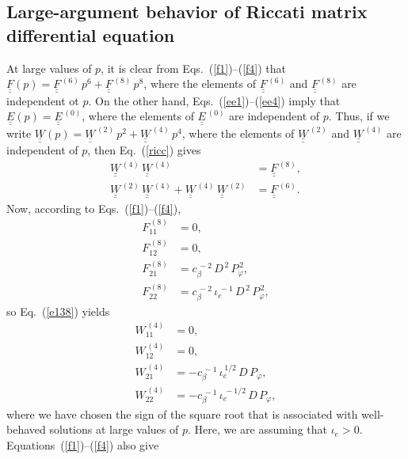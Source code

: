 \documentclass[12pt,prb,aps]{revtex4-1}
\begin{document}
\subsection{Large-argument behavior of Riccati matrix differential equation}
At large values of $p$, it is clear from Eqs.~(\ref{f1})--(\ref{f4}) that  $\underline{\underline{F}}(p)=\underline{\underline{F}}^{\,(6)}\,p^6+ 
\underline{\underline{F}}^{\,(8)}\,p^8$, where the elements of $\underline{\underline{F}}^{\,(6)}$ and $\underline{\underline{F}}^{\,(8)}$ are independent ot $p$.
On the other hand, Eqs.~(\ref{ee1})--(\ref{ee4}) imply that $\underline{\underline{E}}(p)=\underline{\underline{E}}^{\,(0)}$, 
where the elements of $\underline{\underline{E}}^{\,(0)}$ are independent of $p$. 
Thus, if we write $\underline{\underline{W}}(p) =\underline{\underline{W}}^{\,(2)}\,p^2+\underline{\underline{W}}^{\,(4)}\,p^4$,
where the elements of $\underline{\underline{W}}^{\,(2)}$ and  $\underline{\underline{W}}^{\,(4)}$ are independent of $p$, then Eq.~(\ref{ricc}) gives 
\begin{align}\label{e138}
\underline{\underline{W}}^{\,(4)}\,\underline{\underline{W}}^{\,(4)}&= \underline{\underline{F}}^{\,(8)},\\[0.5ex]
\underline{\underline{W}}^{\,(2)}\,\underline{\underline{W}}^{\,(4)}+ \underline{\underline{W}}^{\,(4)}\,\underline{\underline{W}}^{\,(2)}&= 
\underline{\underline{F}}^{\,(6)}.\label{e139}
\end{align}
Now, according to Eqs.~(\ref{f1})--(\ref{f4}), 
\begin{align}
F^{\,(8)}_{11} &=0,\\[0.5ex]
F^{\,(8)}_{12} &= 0,\\[0.5ex]
F^{\,(8)}_{21} &= c_\beta^{\,-2}\,D^{\,2}\,P_\varphi^{\,2},\\[0.5ex]
F^{\,(8)}_{22} &= c_\beta^{\,-2}\,\iota_e^{\,-1}\,D^{\,2}\,P_\varphi^{\,2},
\end{align}
so Eq.~(\ref{e138}) yields 
\begin{align}
W^{\,(4)}_{11} &=0,\\[0.5ex]
W^{\,(4)}_{12} &= 0,\\[0.5ex]
W^{\,(4)}_{21} &= -c_\beta^{\,-1}\,\iota_e^{\,1/2}\,D\,P_\varphi,\\[0.5ex]
W^{\,(4)}_{22} &=-c_\beta^{\,-1}\,\iota_e^{\,-1/2}\, D\,P_\varphi,
\end{align}
where we have chosen the sign of the square root that is associated with well-behaved solutions at large values of $p$. Here, we are  assuming that $\iota_e>0$. 
Equations~(\ref{f1})--(\ref{f4}) also give 
\end{document}
